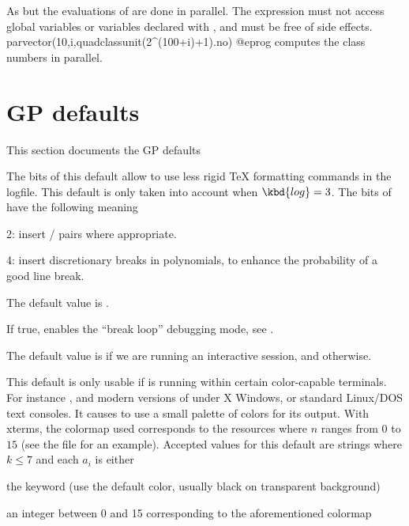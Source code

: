 \label{se:parvector}
As  but the evaluations of  are done in
parallel. The expression  must not access global variables or
variables declared with , and must be free of side effects.
\bprog
parvector(10,i,quadclassunit(2^(100+i)+1).no)
@eprog\noindent
computes the class numbers in parallel.

\section{GP defaults}
\label{se:gp_defaults} This section documents the GP defaults


\label{se:def,TeXstyle}
The bits of this default allow
 to use less rigid TeX formatting commands in the logfile. This
default is only taken into account when $\kbd{log} = 3$. The bits of
 have the following meaning

2: insert  /  pairs where appropriate.

4: insert discretionary breaks in polynomials, to enhance the probability of
a good line break.

The default value is .

\label{se:def,breakloop}
If true, enables the ``break loop'' debugging mode, see
.

The default value is  if we are running an interactive 
session, and  otherwise.

\label{se:def,colors}
This default is only usable if 
is running within certain color-capable terminals. For instance ,
 and modern versions of  under X Windows, or
standard Linux/DOS text consoles. It causes  to use a small palette of
colors for its output. With xterms, the colormap used corresponds to the
resources  where $n$ ranges from $0$ to $15$ (see the
file  for an example). Accepted values for this
default are strings  where $k\le7$ and each
$a_i$ is either

\noindent\item the keyword  (use the default color, usually
black on transparent background)

\noindent\item an integer between 0 and 15 corresponding to the
aforementioned colormap

